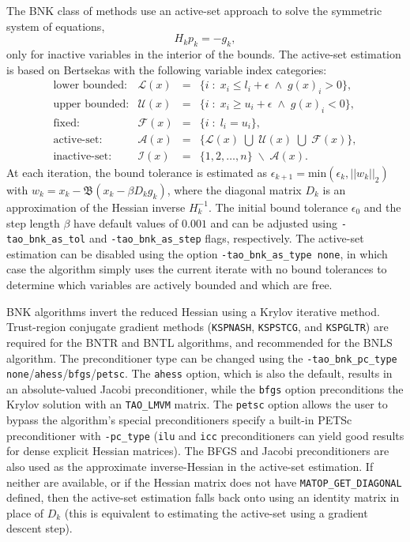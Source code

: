 The BNK class of methods use an active-set approach to solve the symmetric system of equations,
\[
H_k p_k = -g_k,
\]
only for inactive variables in the interior of the bounds. The active-set estimation is based on 
Bertsekas \cite{bertsekas:projected} with the following variable index categories:
\[
\begin{array}{rlll} \displaystyle
\mbox{lower bounded}: & \mathcal{L}(x) & = & \{ i \; : \; x_i \leq l_i + \epsilon \; \land \; g(x)_i > 0 \}, \\
\mbox{upper bounded}: & \mathcal{U}(x) & = & \{ i \; : \; x_i \geq u_i + \epsilon \; \land \; g(x)_i < 0 \}, \\
\mbox{fixed}: & \mathcal{F}(x) & = & \{ i \; : \; l_i = u_i \}, \\
\mbox{active-set}: & \mathcal{A}(x) & = & \{ \mathcal{L}(x) \; \bigcup \; \mathcal{U}(x) \; \bigcup \; \mathcal{F}(x) \}, \\
\mbox{inactive-set}: & \mathcal{I}(x) & = & \{ 1,2,\ldots,n \} \; \backslash \; \mathcal{A}(x).
\end{array}
\]
At each iteration, the bound tolerance is estimated as $\epsilon_{k+1} = \mbox{min}(\epsilon_k, ||w_k||_2)$ 
with $w_k = x_k - \mathfrak{B}(x_k - \beta D_k g_k)$, where the diagonal matrix $D_k$ is an approximation 
of the Hessian inverse $H_k^{-1}$. The initial bound tolerance $\epsilon_0$ and the step length $\beta$ 
have default values of $0.001$ and can be adjusted using {\tt -tao\_bnk\_as\_tol} and 
{\tt -tao\_bnk\_as\_step} flags, respectively. The active-set estimation can be disabled using the option 
{\tt -tao\_bnk\_as\_type none}, in which case the algorithm simply uses the current iterate with no bound 
tolerances to determine which variables are actively bounded and which are free.

BNK algorithms invert the reduced Hessian using a Krylov iterative method. Trust-region conjugate gradient 
methods ({\tt KSPNASH}, {\tt KSPSTCG}, and {\tt KSPGLTR}) are required for the BNTR and BNTL algorithms, 
and recommended for the BNLS algorithm. The preconditioner type can be changed using the 
{\tt -tao\_bnk\_pc\_type} {\tt none}/{\tt ahess}/{\tt bfgs}/{\tt petsc}. The {\tt ahess} option, which is 
also the default, results in an absolute-valued Jacobi preconditioner, while the {\tt bfgs} option 
preconditions the Krylov solution with an {\tt TAO\_LMVM} matrix. The {\tt petsc} option allows the user to 
bypass the algorithm's special preconditioners specify a built-in PETSc preconditioner with {\tt -pc\_type} 
({\tt ilu} and {\tt icc} preconditioners can yield good results for dense explicit Hessian matrices). The 
BFGS and Jacobi preconditioners are also used as the approximate inverse-Hessian in the active-set estimation. 
If neither are available, or if the Hessian matrix does not have {\tt MATOP\_GET\_DIAGONAL} defined, then the 
active-set estimation falls back onto using an identity matrix in place of $D_k$ (this is equivalent to 
estimating the active-set using a gradient descent step).

